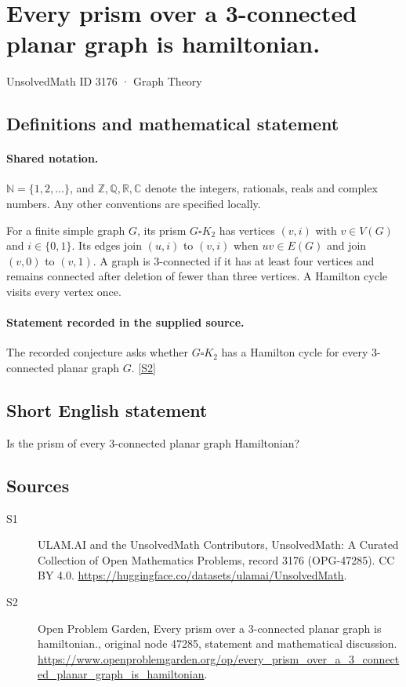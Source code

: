 \documentclass[11pt]{article}
\newcommand{\sref}[2]{\hyperlink{source:#1:#2}{[S#2]}}
\begin{document}
\setcounter{section}{3175}
\section{Every prism over a 3-connected planar graph is hamiltonian.}\label{3176}
{\small\sffamily UnsolvedMath ID 3176 · Graph Theory}
\subsection{Definitions and mathematical statement}

\paragraph{Shared notation.}$\mathbb N=\{1,2,\ldots\}$, and $\mathbb Z,\mathbb Q,\mathbb R,\mathbb C$ denote the integers, rationals, reals and complex numbers. Any other conventions are specified locally.


For a finite simple graph $G$, its prism $G\square K_2$ has vertices $(v,i)$ with $v\in V(G)$ and $i\in\{0,1\}$. Its edges join $(u,i)$ to $(v,i)$ when $uv\in E(G)$ and join $(v,0)$ to $(v,1)$. A graph is $3$-connected if it has at least four vertices and remains connected after deletion of fewer than three vertices. A Hamilton cycle visits every vertex once.
\paragraph{Statement recorded in the supplied source.}
The recorded conjecture asks whether $G\square K_2$ has a Hamilton cycle for every $3$-connected planar graph $G$. \sref{3176}{2}
\subsection{Short English statement}
Is the prism of every 3-connected planar graph Hamiltonian?
\subsection{Sources}
\begin{description}
\item[\hypertarget{source:3176:1}{S1}] ULAM.AI and the UnsolvedMath Contributors, UnsolvedMath: A Curated Collection of Open Mathematics Problems, record 3176 (OPG-47285). CC BY 4.0. \url{https://huggingface.co/datasets/ulamai/UnsolvedMath}.
\item[\hypertarget{source:3176:2}{S2}] Open Problem Garden, Every prism over a 3-connected planar graph is hamiltonian., original node 47285, statement and mathematical discussion. \url{https://www.openproblemgarden.org/op/every_prism_over_a_3_connected_planar_graph_is_hamiltonian}.
\end{description}
\label{end:3176}
\end{document}
